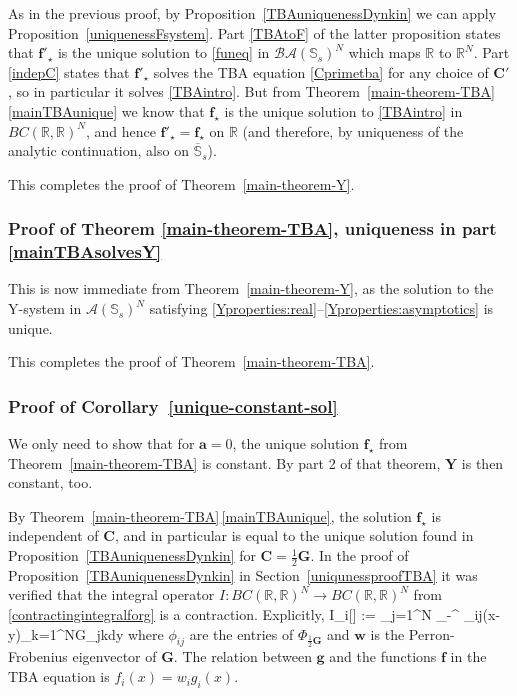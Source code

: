 \documentclass[12pt]{article}
\theoremstyle{plain}
\theoremstyle{definition}
\numberwithin{equation}{section}
\numberwithin{theorem}{section}
\def\be#1\ee{\begin{equation}#1\end{equation}}
\renewcommand{\vec}[1]{\mathbf{#1}}
\begin{document}
As in the previous proof, by Proposition~\ref{TBAuniquenessDynkin} we can apply Proposition~\ref{uniquenessFsystem}. Part \ref{TBAtoF} of the latter proposition states that 
$\vec{f}'_\star$ is the unique solution to \eqref{funeq} in $\mathcal{BA}(\mathbb{S}_s)^N$ which maps $\mathbb{R}$ to $\mathbb{R}^N$.
Part \ref{indepC} states that $\vec{f}'_\star$ solves the TBA equation \eqref{Cprimetba} for any choice of $\vec C'$, so in particular it solves \eqref{TBAintro}.
But from Theorem~\ref{main-theorem-TBA}\,\ref{mainTBAunique} we know that $\vec f_\star$ is the unique solution to \eqref{TBAintro} in $BC(\mathbb{R},\mathbb{R})^N$, and hence $\vec{f}'_\star=\vec{f}_\star$ on $\mathbb{R}$ (and therefore, by uniqueness of the analytic continuation,
 also on $\overline{\mathbb{S}}_s$).

This completes the proof of Theorem~\ref{main-theorem-Y}.

\subsubsection*{Proof of Theorem \ref{main-theorem-TBA}, uniqueness in part \ref{mainTBAsolvesY}}

This is now immediate from Theorem~\ref{main-theorem-Y}, as the solution to the Y-system in $\mathcal{A}(\mathbb{S}_s)^N$ satisfying \ref{Yproperties:real}--\ref{Yproperties:asymptotics} is unique.

This completes the proof of Theorem~\ref{main-theorem-TBA}.

\subsubsection*{Proof of Corollary~\ref{unique-constant-sol}}

We only need to show that for $\vec a=0$, the unique solution $\vec f_\star$ 
from Theorem~\ref{main-theorem-TBA} is constant. By part 2 of that theorem, $\vec Y$ is then constant, too. 

By Theorem~\ref{main-theorem-TBA}\,\ref{mainTBAunique}, the solution $\vec f_\star$ is independent of $\vec C$, and in particular is equal to the unique solution found in Proposition~\ref{TBAuniquenessDynkin} for $\vec C = \tfrac12 \vec G$. 
In the proof of Proposition~\ref{TBAuniquenessDynkin} in Section~\ref{uniqunessproofTBA} it was verified that the integral operator
$I : BC(\mathbb{R},\mathbb{R})^N \to BC(\mathbb{R},\mathbb{R})^N$ from \eqref{contractingintegralforg} is a contraction. Explicitly,
\be \label{contTBAoperator}
	I_i[\vec g] := 
\sum_{j=1}^N
\int_{-\infty}^{\infty} \phi_{ij}(x-y)\sum_{k=1}^NG_{jk} dy
\ee
where $\phi_{ij}$ are the entries of $\Phi_{\frac12 \vec G}$ and $\vec w$ is the Perron-Frobenius eigenvector of $\vec{G}$.
The relation between $\vec g$ and the functions $\vec f$ in the TBA equation is $f_i(x) = w_i g_i(x)$. 
\end{document}
